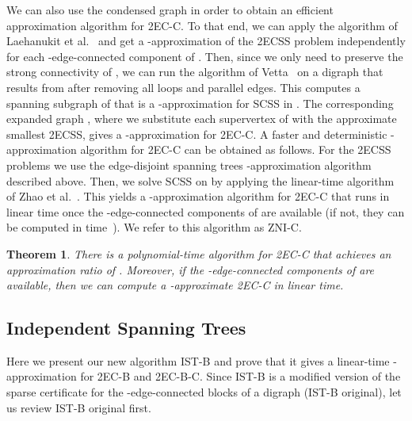 \documentclass[11pt]{article}
\newtheorem{theorem}{Theorem}[section]
\begin{document}
We can also use the condensed graph in order to obtain an efficient approximation algorithm for \textsf{2EC-C}.
To that end, we can apply the algorithm of Laehanukit et al.~\cite{LGS:MSCS:2012} and get a -approximation of the \textsf{2ECSS} problem independently for each -edge-connected component of .
Then, since we only need to preserve the strong connectivity of , we can run the algorithm of Vetta~\cite{Vetta:MSCS:2001} on a digraph  that results from  after removing all loops and parallel edges.
This computes a spanning subgraph  of  that is a -approximation for \textsf{SCSS} in .
The corresponding expanded graph , where we substitute each supervertex  of  with the approximate smallest \textsf{2ECSS}, gives a -approximation for \textsf{2EC-C}.
A faster and deterministic -approximation algorithm for \textsf{2EC-C} can be obtained as follows.
For the \textsf{2ECSS} problems we use the edge-disjoint spanning trees -approximation algorithm described above.
Then, we solve \textsf{SCSS} on  by applying the linear-time algorithm of Zhao et al.~\cite{ZNI:MSCS:2003}.
This yields a -approximation algorithm for \textsf{2EC-C} that runs in linear time once the -edge-connected components of  are available (if not, they can be computed in  time~\cite{2CC:HenzingerKL14}).
We refer to this algorithm as \textsf{ZNI-C}.


\begin{theorem}
\label{theorem:2EC-C}
There is a polynomial-time algorithm for \textsf{2EC-C} that achieves an approximation ratio of . Moreover, if the -edge-connected components of  are available, then we can compute a -approximate \textsf{2EC-C} in linear time.
\end{theorem}


\subsection{Independent Spanning Trees}
\label{section:IST}

Here we present our new algorithm \textsf{IST-B} and prove that it
gives a linear-time -approximation for \textsf{2EC-B} and
\textsf{2EC-B-C}. Since \textsf{IST-B} is a modified version of
the sparse certificate  for the -edge-connected blocks of
a digraph  \cite{2ECB} (\textsf{IST-B original}), let us review
\textsf{IST-B original} first.
\end{document}
